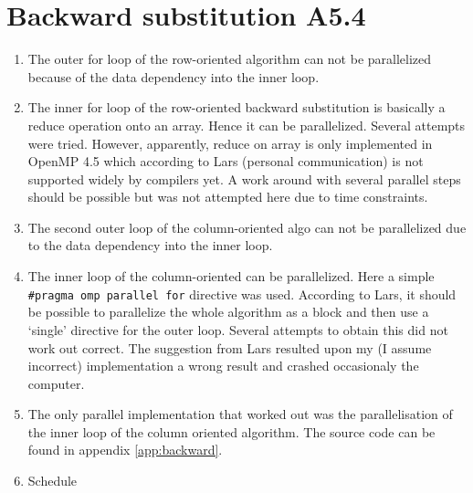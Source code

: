 \documentclass[a4paper,11pt,twoside]{article}
\begin{document}
\section{Backward substitution A5.4}
\begin{enumerate}[label={\alph*)}]
\item The outer for loop of the row-oriented algorithm can not be parallelized because of the data dependency into the inner loop. 
\item The inner for loop of the row-oriented backward substitution is basically a reduce operation onto an array. Hence it can be parallelized. Several attempts were tried. However, apparently, reduce on array is only implemented in OpenMP 4.5 which according to Lars (personal communication) is not supported widely by compilers yet. A work around with several parallel steps should be possible but was not attempted here due to time constraints. 
\item The second outer loop of the column-oriented algo can not be parallelized due to the data dependency into the inner loop. 
\item The inner loop of the column-oriented can be parallelized. Here a simple \verb+#pragma omp parallel for+ directive was used. According to Lars, it should be possible to parallelize the whole algorithm as a block and then use a `single' directive for the outer loop. Several attempts to obtain this did not work out correct. The suggestion from Lars resulted upon my (I assume incorrect) implementation a wrong result and crashed occasionaly the computer. 
\item The only parallel implementation that worked out was the parallelisation of the inner loop of the column oriented algorithm. The source code can be found in appendix \ref{app:backward}.

\item Schedule
\end{enumerate}


\appendix
\end{document}
